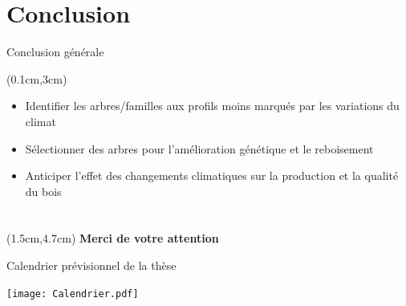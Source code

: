 \documentclass{beamer}
\begin{document}
\section{Conclusion }
\begin{frame}{Conclusion générale}
	
	\begin{textblock*}{11cm}(0.1cm,3cm)
		\begin{itemize} %
			\item Identifier les arbres/familles aux profils moins marqués par les variations du climat\\
			\vspace{0.7cm}
			\item Sélectionner des arbres pour l'amélioration génétique et le reboisement\\
			\vspace{0.7cm}
			\item Anticiper l'effet des changements climatiques sur la production et la qualité du bois\\
		\end{itemize}
	\end{textblock*}
	
\end{frame}
\section{ }
\begin{frame}%
	
	\begin{textblock*}{10cm}(1.5cm,4.7cm)
		\centering
		{\Large \textbf{Merci de votre attention}}\\	
	\end{textblock*}
	
\end{frame}
\begin{frame}{Calendrier prévisionnel de la thèse}
	
\texttt{[image: Calendrier.pdf]}
	
\end{frame}
\end{document}
